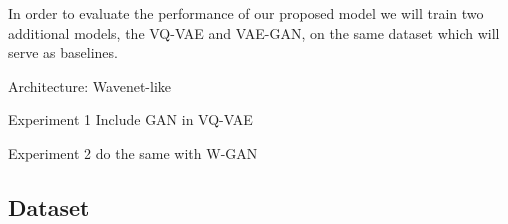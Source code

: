 \documentclass{article}
\begin{document}

In order to evaluate the performance of our proposed model we will train two additional models, the VQ-VAE and VAE-GAN, on the same dataset which will serve as baselines.


Architecture: Wavenet-like



Experiment 1
Include GAN in VQ-VAE

Experiment 2
do the same with W-GAN

\subsection{Dataset} 
\end{document}
